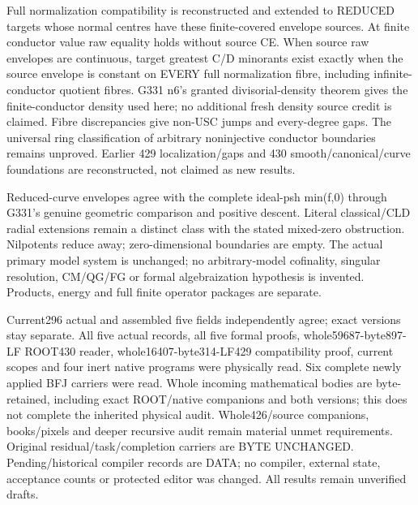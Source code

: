 \documentclass[11pt]{article}
\begin{document}
Full normalization compatibility is reconstructed and extended to REDUCED targets whose normal centres have these finite-covered envelope sources. At finite conductor value raw equality holds without source CE. When source raw envelopes are continuous, target greatest C/D minorants exist exactly when the source envelope is constant on EVERY full normalization fibre, including infinite-conductor quotient fibres. G331 n6's granted divisorial-density theorem gives the finite-conductor density used here; no additional fresh density source credit is claimed. Fibre discrepancies give non-USC jumps and every-degree gaps. The universal ring classification of arbitrary noninjective conductor boundaries remains unproved. Earlier 429 localization/gaps and 430 smooth/canonical/curve foundations are reconstructed, not claimed as new results.

Reduced-curve envelopes agree with the complete ideal-psh min(f,0) through G331's genuine geometric comparison and positive descent. Literal classical/CLD radial extensions remain a distinct class with the stated mixed-zero obstruction. Nilpotents reduce away; zero-dimensional boundaries are empty. The actual primary model system is unchanged; no arbitrary-model cofinality, singular resolution, CM/QG/FG or formal algebraization hypothesis is invented. Products, energy and full finite operator packages are separate.

Current296 actual and assembled five fields independently agree; exact versions stay separate. All five actual records, all five formal proofs, whole59687-byte897-LF ROOT430 reader, whole16407-byte314-LF429 compatibility proof, current scopes and four inert native programs were physically read. Six complete newly applied BFJ carriers were read. Whole incoming mathematical bodies are byte-retained, including exact ROOT/native companions and both versions; this does not complete the inherited physical audit. Whole426/source companions, books/pixels and deeper recursive audit remain material unmet requirements. Original residual/task/completion carriers are BYTE UNCHANGED. Pending/historical compiler records are DATA; no compiler, external state, acceptance counts or protected editor was changed. All results remain unverified drafts.
\end{document}
